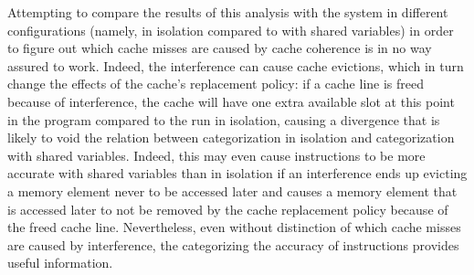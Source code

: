 Attempting to compare the results of this analysis with the system in different
configurations (namely, in isolation compared to with shared variables) in
order to figure out which cache misses are caused by cache coherence is in no
way assured to work. Indeed, the interference can cause cache evictions, which
in turn change the effects of the cache's replacement policy: if a cache line
is freed because of interference, the cache will have one extra available slot
at this point in the program compared to the run in isolation, causing a
divergence that is likely to void the relation between categorization in
isolation and categorization with shared variables. Indeed, this may even cause
instructions to be more accurate with shared variables than in isolation if an
interference ends up evicting a memory element never to be accessed later and
causes a memory element that is accessed later to not be removed by the cache
replacement policy because of the freed cache line. Nevertheless, even without
distinction of which cache misses are caused by interference, the categorizing
the accuracy of instructions provides useful information.

